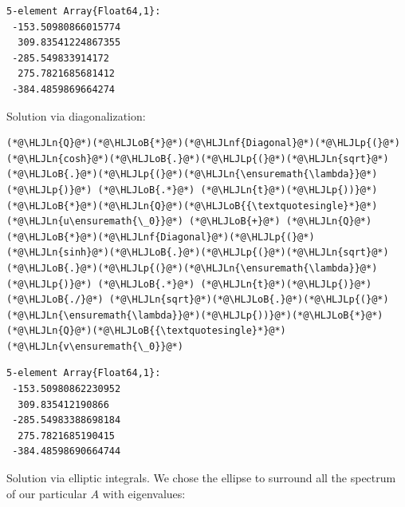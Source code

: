 \documentclass[12pt,a4paper]{article}
\newcommand{\HLJLn}[1]{#1}
\newcommand{\HLJLnf}[1]{\textcolor[RGB]{66,102,213}{#1}}
\newcommand{\HLJLoB}[1]{\textcolor[RGB]{102,102,102}{\textbf{#1}}}
\newcommand{\HLJLp}[1]{#1}
\begin{document}
\begin{lstlisting}
5-element Array{Float64,1}:
 -153.50980866015774
  309.83541224867355
 -285.549833914172  
  275.7821685681412 
 -384.4859869664274
\end{lstlisting}


Solution via diagonalization:


\begin{lstlisting}
(*@\HLJLn{Q}@*)(*@\HLJLoB{*}@*)(*@\HLJLnf{Diagonal}@*)(*@\HLJLp{(}@*)(*@\HLJLn{cosh}@*)(*@\HLJLoB{.}@*)(*@\HLJLp{(}@*)(*@\HLJLn{sqrt}@*)(*@\HLJLoB{.}@*)(*@\HLJLp{(}@*)(*@\HLJLn{\ensuremath{\lambda}}@*)(*@\HLJLp{)}@*) (*@\HLJLoB{.*}@*) (*@\HLJLn{t}@*)(*@\HLJLp{))}@*)(*@\HLJLoB{*}@*)(*@\HLJLn{Q}@*)(*@\HLJLoB{{\textquotesingle}*}@*)(*@\HLJLn{u\ensuremath{\_0}}@*) (*@\HLJLoB{+}@*) (*@\HLJLn{Q}@*)(*@\HLJLoB{*}@*)(*@\HLJLnf{Diagonal}@*)(*@\HLJLp{(}@*)(*@\HLJLn{sinh}@*)(*@\HLJLoB{.}@*)(*@\HLJLp{(}@*)(*@\HLJLn{sqrt}@*)(*@\HLJLoB{.}@*)(*@\HLJLp{(}@*)(*@\HLJLn{\ensuremath{\lambda}}@*)(*@\HLJLp{)}@*) (*@\HLJLoB{.*}@*) (*@\HLJLn{t}@*)(*@\HLJLp{)}@*) (*@\HLJLoB{./}@*) (*@\HLJLn{sqrt}@*)(*@\HLJLoB{.}@*)(*@\HLJLp{(}@*)(*@\HLJLn{\ensuremath{\lambda}}@*)(*@\HLJLp{))}@*)(*@\HLJLoB{*}@*)(*@\HLJLn{Q}@*)(*@\HLJLoB{{\textquotesingle}*}@*)(*@\HLJLn{v\ensuremath{\_0}}@*)
\end{lstlisting}

\begin{lstlisting}
5-element Array{Float64,1}:
 -153.50980862230952
  309.835412190866  
 -285.54983388698184
  275.7821685190415 
 -384.48598690664744
\end{lstlisting}


Solution via elliptic integrals. We chose the ellipse to surround all the spectrum of our particular $A$ with eigenvalues:
\end{document}
